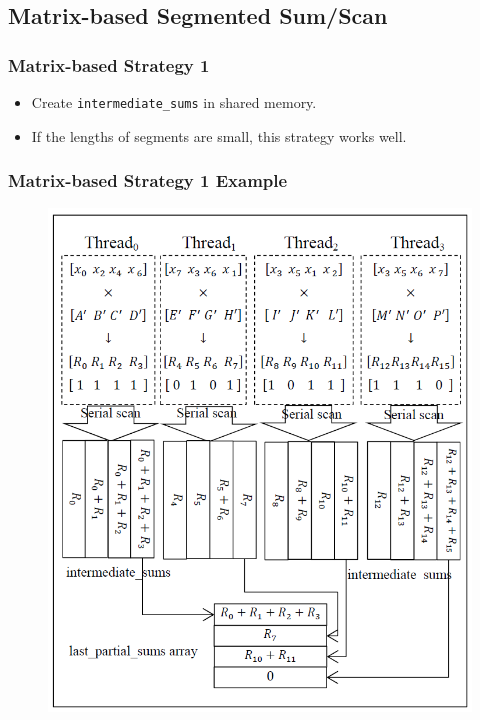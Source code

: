\subsection{Matrix-based Segmented Sum/Scan}
\begin{frame}
	\frametitle{Matrix-based Strategy 1}
	\begin{itemize}
		\item Create \lstinline{intermediate_sums} in shared memory.
		\item If the lengths of segments are small, this strategy
			works well.
	\end{itemize}
\end{frame}
\begin{frame}
	\frametitle{Matrix-based Strategy 1 Example}
	\begin{figure}
		\includegraphics[scale=0.25]{figure/fig2-strategy1.png}
	\end{figure}
\end{frame}

